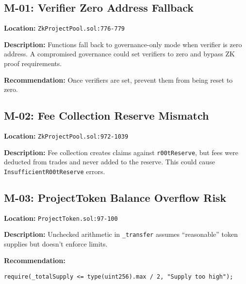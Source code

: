 \documentclass[11pt,a4paper]{article}
\begin{document}
\begin{mediumbox}
\subsection{M-01: Verifier Zero Address Fallback}
\end{mediumbox}

\textbf{Location:} \texttt{ZkProjectPool.sol:776-779}

\textbf{Description:}
Functions fall back to governance-only mode when verifier is zero address. A compromised governance could set verifiers to zero and bypass ZK proof requirements.

\textbf{Recommendation:}
Once verifiers are set, prevent them from being reset to zero.

\vspace{1em}

\begin{mediumbox}
\subsection{M-02: Fee Collection Reserve Mismatch}
\end{mediumbox}

\textbf{Location:} \texttt{ZkProjectPool.sol:972-1039}

\textbf{Description:}
Fee collection creates claims against \texttt{r00tReserve}, but fees were deducted from trades and never added to the reserve. This could cause \texttt{InsufficientR00tReserve} errors.

\vspace{1em}

\begin{mediumbox}
\subsection{M-03: ProjectToken Balance Overflow Risk}
\end{mediumbox}

\textbf{Location:} \texttt{ProjectToken.sol:97-100}

\textbf{Description:}
Unchecked arithmetic in \texttt{\_transfer} assumes ``reasonable'' token supplies but doesn't enforce limits.

\textbf{Recommendation:}
\begin{lstlisting}
require(_totalSupply <= type(uint256).max / 2, "Supply too high");
\end{lstlisting}

\vspace{1em}
\end{document}
